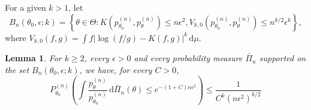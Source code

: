 \documentclass[11pt]{article}
\theoremstyle{plain}
\newtheorem{lemma}{\quad\quad Lemma}
\theoremstyle{definition}
\theoremstyle{remark}
\begin{document}
For a given $k>1$, let
\begin{equation*}
    B_n\left( \theta_0, \epsilon; k \right)=
    \left\{ 
    \theta \in \Theta:
    K\left( p_{\theta_0}^{(n)},p_{\theta}^{(n)} \right)\leq n \epsilon^2,
    V_{k,0}\left( p_{\theta_0}^{(n)}, p_{\theta}^{(n)} \right)\leq n^{k/2} \epsilon^k
\right\},
\end{equation*}
where $V_{k,0}(f,g)=\int f|\log (f/g)- K(f,g)|^k \, \mathrm d \mu$.
\begin{lemma}
    For $k\geq 2$, every $\epsilon>0$ and every probability measure $\bar \Pi_n$ supported on the set $B_n \left( \theta_0, \epsilon; k \right)$, we have, for every $C>0$,
    \begin{equation*}
        P_{\theta_0}^{(n)} \left( 
            \int 
            \frac{p_{\theta}^{(n)}}{p_{\theta_0}^{(n)}}
            \,\mathrm d \bar \Pi_n (\theta)
            \leq e^{-(1+C)n \epsilon^2} 
        \right)
        \leq
        \frac{1}{C^k (n\epsilon^2)^{k/2}}
    \end{equation*}
    \label{lemma:KLball}
\end{lemma}
\end{document}
